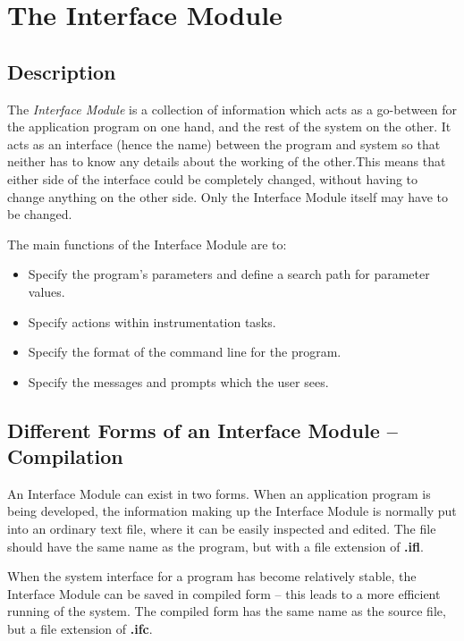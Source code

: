\documentclass[twoside,11pt]{article}
\newcommand{\xlabel}[1]{}
\renewcommand{\_}{\texttt{\symbol{95}}}
\begin{document}
\section{The Interface Module\xlabel{the_interface_module}}

\subsection{Description\xlabel{description}}

The {\em Interface Module}\/ is a collection of information which acts as a
go-between for the application program on one hand, and the rest of the
system on the other. It acts as an interface (hence the name) between
the program and system so that neither has to know any details about
the working of the other.This means that either
side of the interface could be completely changed, without having to
change anything on the other side.
Only the Interface Module itself may have to be changed. 

The main functions of the Interface Module are to:
\begin{itemize}
\item Specify the program's parameters and define a search path for
parameter values.
\item Specify actions within instrumentation tasks.
\item Specify the format of the command line for the program.
\item Specify the messages and prompts which the user sees.
\end{itemize}

\subsection{Different Forms of an Interface Module -- Compilation
\xlabel{different_forms_of_an_interface_module}}

An Interface Module can exist in two forms. When an application
program is being developed, the information making up the Interface
Module is normally put into an ordinary text file, where it can be
easily inspected and edited.
The file should have the same name as the program, but with a file 
extension of {\bf .ifl}.

When the system interface for a program has become relatively stable, the 
Interface Module can be saved in compiled form --
this leads to a more efficient running of the system. 
The compiled form has the same name as the source file, but a file extension of
{\bf .ifc}.
\end{document}
